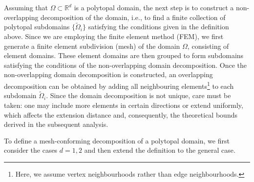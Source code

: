\documentclass[a4paper, 11pt]{article}
\theoremstyle{remark}
\begin{document}
Assuming that $\Omega \subset \mathbb{R}^{d}$ is a polytopal domain, the next step is to construct a non-overlapping decomposition of the domain, i.e., to find a finite collection of polytopal subdomains $\{\widetilde{\Omega}_{i}\}$ satisfying the conditions given in the definition above. Since we are employing the finite element method (FEM), we first generate a finite element subdivision (mesh) of the domain $\Omega$, consisting of element domains. These element domains are then grouped to form subdomains satisfying the conditions of the non-overlapping domain decomposition. Once the non-overlapping domain decomposition is constructed, an overlapping decomposition can be obtained by adding all neighbouring elements\footnote{Here, we assume vertex neighbourhoods rather than edge neighbourhoods.} to each subdomain $\widetilde{\Omega}_{i}$. Since the domain decomposition is not unique, care must be taken: one may include more elements in certain directions or extend uniformly, which affects the extension distance and, consequently, the theoretical bounds derived in the subsequent analysis.

To define a mesh-conforming decomposition of a polytopal domain, we first consider the cases $d = 1, 2$ and then extend the definition to the general case.
\end{document}
